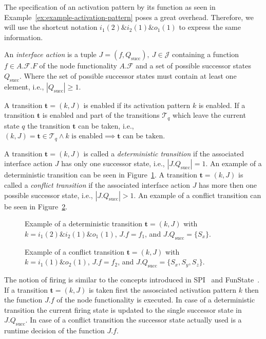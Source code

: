 The specification of an activation pattern by its function as seen in Example~\ref{ex:example-activation-pattern}
poses a great overhead. Therefore, we will use the shortcut notation
$i_1(2) \& i_2(1) \& o_1(1)$ to express the same information.

\begin{definition}\label{interface-action}
  An \emph{interface action} is a tuple $J = (f,Q_\mathrm{succ}),\ J \in \mathcal{J}$ containing
  a function $f \in A.\mathcal{F}.F$ of the node functionality $A.\mathcal{F}$
  and a set of possible successor states $Q_\mathrm{succ}$. Where the set of
  possible successor states must contain at least one element, i.e.,
  $|Q_\mathrm{succ}| \ge 1$.
\end{definition}

A transition $\mathbf{t} = (k,J)$ is enabled if its activation
pattern $k$ is enabled. If a transition $\mathbf{t}$ is enabled and 
part of the transitions $\mathcal{T}_q$ which leave the current state $q$
the transition $\mathbf{t}$ can be taken, i.e.,
$(k,J) = \mathbf{t} \in \mathcal{T}_q \wedge k\textrm{ is enabled} \implies \mathbf{t}\textrm{ can be taken}$.

A transition $\mathbf{t} = (k,J)$ is called a \emph{deterministic transition}
if the associated interface action $J$ has only one successor state, i.e.,
$|J.Q_\mathrm{succ}| = 1$. An example of a deterministic transition can
be seen in Figure~\ref{fig:deterministic-transition}.
A transition $\mathbf{t} = (k,J)$ is called a \emph{conflict transition}
if the associated interface action $J$ has more then one possible
successor state, i.e., $|J.Q_\mathrm{succ}| > 1$. An example of a
conflict transition can be seen in Figure~\ref{fig:conflict-transition}.

\begin{figure}[h]
\centering

\caption{Example of a deterministic transition $\mathbf{t} = (k,J)$
with $k = i_1(2) \& i_2(1) \& o_1(1)$, $J.f = f_1$, and
$J.Q_\mathrm{succ} = \{S_x\}$.}
\label{fig:deterministic-transition}
\end{figure}

\begin{figure}[h]
\centering

\caption{Example of a conflict transition $\mathbf{t} = (k,J)$
with $k = i_1(1) \& o_2(1)$, $J.f = f_2$, and $J.Q_\mathrm{succ} = \{S_x,S_y,S_z\}$.}
\label{fig:conflict-transition}
\end{figure}

The notion of firing is similar to the concepts introduced in
SPI~\cite{ZERTT99a} and FunState~\cite{STZETG00}.
If a transition $\mathbf{t} = (k,J)$ is taken first the assosciated
activation pattern $k$ then the function $J.f$ of the node functionality
is executed. In case of a deterministic transition the current firing
state is updated to the single successor state in $J.Q_\mathrm{succ}$.
In case of a conflict transition the successor state actually used is
a runtime decision of the function $J.f$.

